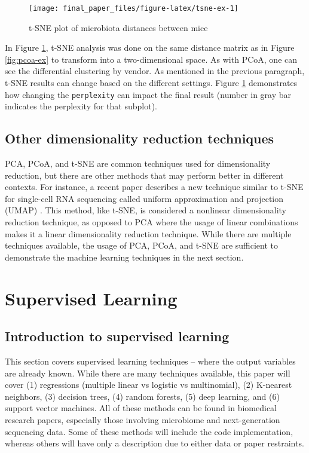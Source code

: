 \documentclass[12pt,openany]{book}
\begin{document}
\begin{figure}
\texttt{[image: final\_paper\_files/figure-latex/tsne-ex-1]} \caption{t-SNE plot of microbiota distances between mice}\label{fig:tsne-ex}
\end{figure}

In Figure \ref{fig:tsne-ex}, t-SNE analysis was done on the same
distance matrix as in Figure \ref{fig:pcoa-ex} to transform into a
two-dimensional space. As with PCoA, one can see the differential
clustering by vendor. As mentioned in the previous paragraph, t-SNE
results can change based on the different settings. Figure
\ref{fig:tsne-ex} demonstrates how changing the \texttt{perplexity} can
impact the final result (number in gray bar indicates the perplexity for
that subplot).

\section{Other dimensionality reduction
techniques}\label{other-dimensionality-reduction-techniques}

PCA, PCoA, and t-SNE are common techniques used for dimensionality
reduction, but there are other methods that may perform better in
different contexts. For instance, a recent paper describes a new
technique similar to t-SNE for single-cell RNA sequencing called uniform
approximation and projection (UMAP) \citep{becht2018dimensionality}.
This method, like t-SNE, is considered a nonlinear dimensionality
reduction technique, as opposed to PCA where the usage of linear
combinations makes it a linear dimensionality reduction technique. While
there are multiple techniques available, the usage of PCA, PCoA, and
t-SNE are sufficient to demonstrate the machine learning techniques in
the next section.

\chapter{Supervised Learning}\label{sup_learn}

\section{Introduction to supervised
learning}\label{introduction-to-supervised-learning}

This section covers supervised learning techniques -- where the output
variables are already known. While there are many techniques available,
this paper will cover (1) regressions (multiple linear vs logistic vs
multinomial), (2) K-nearest neighbors, (3) decision trees, (4) random
forests, (5) deep learning, and (6) support vector machines. All of
these methods can be found in biomedical research papers, especially
those involving microbiome and next-generation sequencing data. Some of
these methods will include the code implementation, whereas others will
have only a description due to either data or paper restraints.
\end{document}
